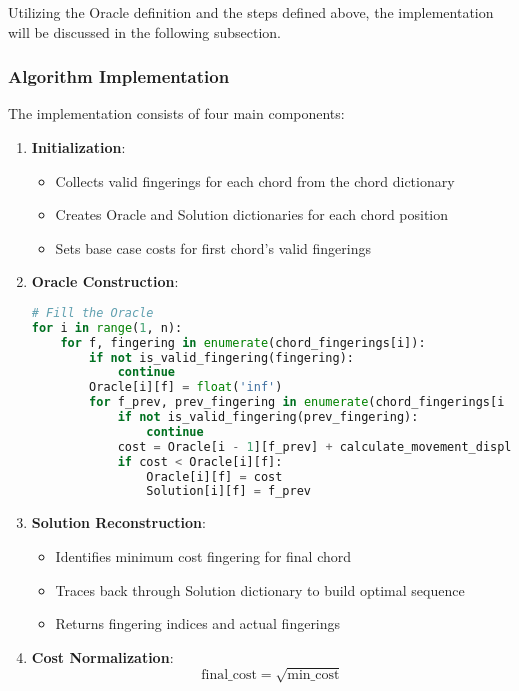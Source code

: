\documentclass[conference]{IEEEtran}
\begin{document}
Utilizing the Oracle definition and the steps defined above, the implementation will be discussed in the following subsection.

\subsubsection{Algorithm Implementation}
The implementation consists of four main components:

\begin{enumerate}
\item \textbf{Initialization}:
\begin{itemize}
    \item Collects valid fingerings for each chord from the chord dictionary
    \item Creates Oracle and Solution dictionaries for each chord position
    \item Sets base case costs for first chord's valid fingerings
\end{itemize}

\item \textbf{Oracle Construction}:
\begin{lstlisting}[language=Python]
# Fill the Oracle
for i in range(1, n):
    for f, fingering in enumerate(chord_fingerings[i]):
        if not is_valid_fingering(fingering):
            continue
        Oracle[i][f] = float('inf')
        for f_prev, prev_fingering in enumerate(chord_fingerings[i - 1]):
            if not is_valid_fingering(prev_fingering):
                continue
            cost = Oracle[i - 1][f_prev] + calculate_movement_displacement(prev_fingering, fingering)
            if cost < Oracle[i][f]:
                Oracle[i][f] = cost
                Solution[i][f] = f_prev
\end{lstlisting}

\item \textbf{Solution Reconstruction}:
\begin{itemize}
    \item Identifies minimum cost fingering for final chord
    \item Traces back through Solution dictionary to build optimal sequence
    \item Returns fingering indices and actual fingerings
\end{itemize}

\item \textbf{Cost Normalization}:
\[ \text{final\_cost} = \sqrt{\text{min\_cost}} \]
\end{enumerate}
\end{document}
